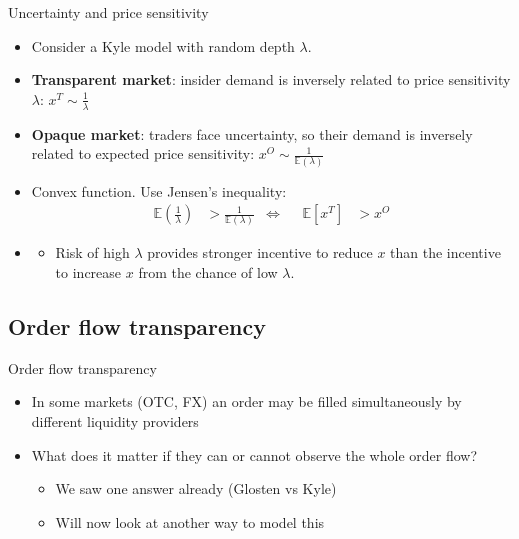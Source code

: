 \documentclass[english,10pt
,aspectratio=169
]{beamer}
\begin{document}
\begin{frame}[label=quotes]{Uncertainty and price sensitivity}
	\begin{itemize}
		\item Consider a Kyle model with random depth $\lambda$.
		\item \textbf{Transparent market}: insider demand is inversely related to price sensitivity $\lambda$: $x^T \sim \frac{1}{\lambda}$
		\item \textbf{Opaque market}: traders face uncertainty, so their demand is inversely related to expected price sensitivity: $x^O \sim \frac{1}{\mathbb{E}(\lambda)}$
		\item Convex function. Use Jensen's inequality: 
		\begin{align*}
			\mathbb{E}\left(\frac{1}{\lambda}\right) &> \frac{1}{\mathbb{E}(\lambda)}
			&\iff & &
			\mathbb{E} [x^T] &> x^O
		\end{align*}
		\item {}
		\begin{itemize}
			\item Risk of high $\lambda$ provides stronger incentive to reduce $x$ than the incentive to increase $x$ from the chance of low $\lambda$.
		\end{itemize}
	\end{itemize}
\end{frame}


\subsection{Order flow transparency}

\begin{frame}{Order flow transparency}
	\begin{itemize}
		\item In some markets (OTC, FX) an order may be filled simultaneously by different liquidity providers
		\item What does it matter if they can or cannot observe the whole order flow?
		\pause
		\begin{itemize}
			\item We saw one answer already (Glosten vs Kyle)
			\item Will now look at another way to model this
		\end{itemize}
	\end{itemize}
\end{frame}
\end{document}
